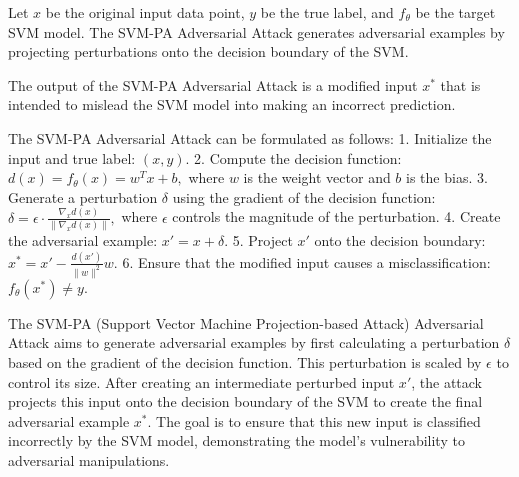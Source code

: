 Let \( x \) be the original input data point, \( y \) be the true label, and \( f_{\theta} \) be the target SVM model. The SVM-PA Adversarial Attack generates adversarial examples by projecting perturbations onto the decision boundary of the SVM.

The output of the SVM-PA Adversarial Attack is a modified input \( x^* \) that is intended to mislead the SVM model into making an incorrect prediction.

The SVM-PA Adversarial Attack can be formulated as follows:
1. Initialize the input and true label:
   $
   (x, y).
   $
2. Compute the decision function:
   $
   d(x) = f_{\theta}(x) = w^T x + b,
   $
   where \( w \) is the weight vector and \( b \) is the bias.
3. Generate a perturbation \( \delta \) using the gradient of the decision function:
   $
   \delta = \epsilon \cdot \frac{\nabla_x d(x)}{\|\nabla_x d(x)\|},
   $
   where \( \epsilon \) controls the magnitude of the perturbation.
4. Create the adversarial example:
   $
   x' = x + \delta.
   $
5. Project \( x' \) onto the decision boundary:
   $
   x^* = x' - \frac{d(x')}{\|w\|^2} w.
   $
6. Ensure that the modified input causes a misclassification:
   $
   f_{\theta}(x^*) \neq y.
   $

The SVM-PA (Support Vector Machine Projection-based Attack) Adversarial Attack aims to generate adversarial examples by first calculating a perturbation \( \delta \) based on the gradient of the decision function. This perturbation is scaled by \( \epsilon \) to control its size. After creating an intermediate perturbed input \( x' \), the attack projects this input onto the decision boundary of the SVM to create the final adversarial example \( x^* \). The goal is to ensure that this new input is classified incorrectly by the SVM model, demonstrating the model's vulnerability to adversarial manipulations.

